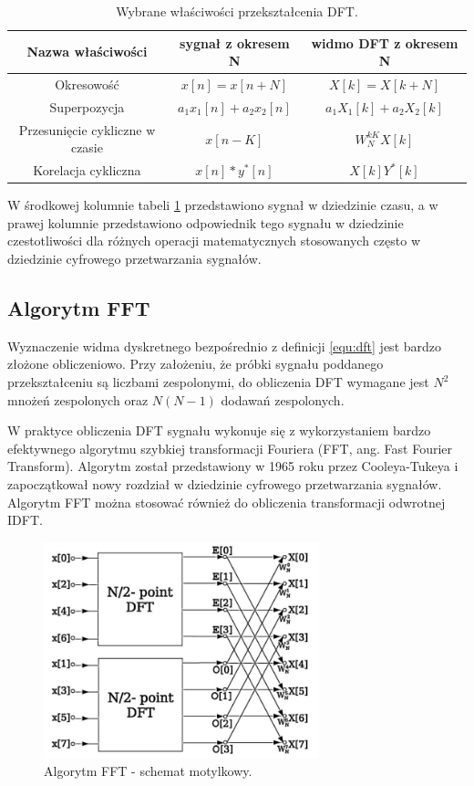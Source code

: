 \begin{table}[H]
	\caption{Wybrane właściwości przekształcenia DFT.}
	\centering
	\label{tab:dft_wlasc}
	\begin{tabular}{|c|c|c|}
		\hline 
		\textbf{Nazwa właściwości} & \textbf{sygnał z okresem N} & \textbf{widmo DFT z okresem N} 	\\
		\hline
		Okresowość					& $x[n] = x[n + N]$ 				& $X[k] = X[k + N]$ 				\\	\hline
		Superpozycja			& $a_{1}x_{1}[n] + a_{2}x_{2}[n]$			& $a_{1}X_{1}[k] + a_{2}X_{2}[k]$			\\	\hline
		Przesunięcie cykliczne w czasie			& $x[n-K]$			& $ W_{N}^{kK}X[k]$			\\	\hline
		Korelacja cykliczna 		 				& $x[n]*y^{*}[n]$			& $X[k]Y^{*}[k]$			\\ 	\hline
	\end{tabular}
\end{table}
W środkowej kolumnie tabeli \ref{tab:dft_wlasc} przedstawiono sygnał w dziedzinie czasu, a w prawej kolumnie przedstawiono odpowiednik tego sygnału w dziedzinie czestotliwości dla różnych operacji matematycznych stosowanych często w dziedzinie cyfrowego przetwarzania sygnałów.

\subsection{Algorytm FFT}
Wyznaczenie widma dyskretnego bezpośrednio z definicji \ref{equ:dft} jest bardzo złożone obliczeniowo. Przy założeniu, że próbki sygnału poddanego przekształceniu są liczbami zespolonymi, do obliczenia DFT wymagane jest $N^{2}$ mnożeń zespolonych oraz $N(N-1)$ dodawań zespolonych.

W praktyce obliczenia DFT sygnału wykonuje się z wykorzystaniem bardzo efektywnego algorytmu szybkiej transformacji Fouriera (FFT, ang. Fast Fourier Transform). Algorytm został przedstawiony w 1965 roku przez Cooleya-Tukeya i zapoczątkował nowy rozdział w dziedzinie cyfrowego przetwarzania sygnałów. Algorytm FFT można stosować również do obliczenia transformacji odwrotnej IDFT.

\begin{figure}[H]
	\centering
	\includegraphics[width=8cm]{./grafiki/fft_motylki}
	\captionsetup{justification=centering}
	\caption{Algorytm FFT - schemat motylkowy.}
	\label{rys:fft_motyl}
\end{figure}

